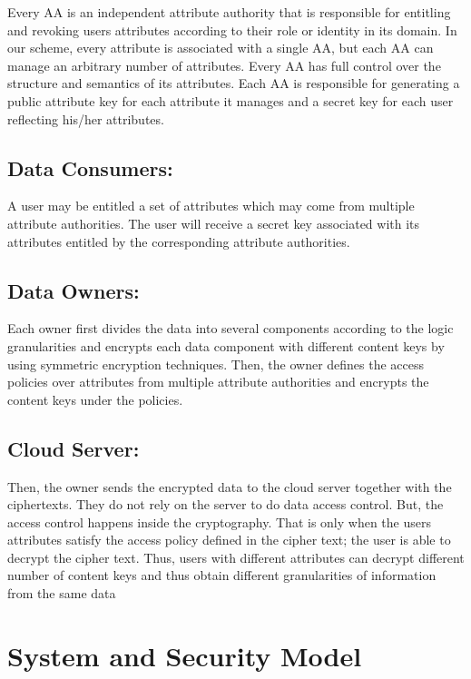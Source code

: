 \documentclass[11pt,a4paper]{report}
\begin{document}
Every AA is an independent
attribute authority that is responsible for entitling and
revoking users attributes according to their role or
identity in its domain. In our scheme, every attribute
is associated with a single AA, but each AA can
manage an arbitrary number of attributes. Every AA
has full control over the structure and semantics of its
attributes. Each AA is responsible for generating a
public attribute key for each attribute it manages and a
secret key for each user reflecting his/her attributes.

\subsection{Data Consumers:}

A user may be entitled a set of attributes
which may come from multiple attribute authorities.
The user will receive a secret key associated with its
attributes entitled by the corresponding attribute
authorities.

\subsection{Data Owners:}
Each owner first divides the data into
several components according to the logic
granularities and encrypts each data component with
different content keys by using symmetric encryption
techniques. Then, the owner defines the access
policies over attributes from multiple attribute
authorities and encrypts the content keys under the
policies.

\subsection{Cloud Server:}

Then, the owner sends the encrypted
data to the cloud server together with the ciphertexts.
They do not rely on the server to do data access
control. But, the access control happens inside the
cryptography. That is only when the users attributes
satisfy the access policy defined in the cipher text; the
user is able to decrypt the cipher text. Thus, users with
different attributes can decrypt different number of
content keys and thus obtain different granularities of
information from the same data

\section{System and Security Model}
\end{document}
